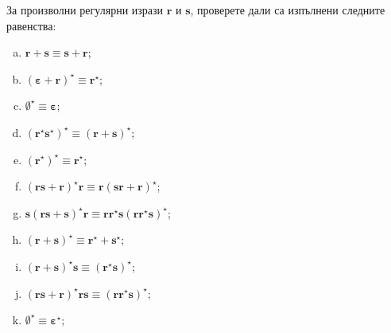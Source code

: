 \begin{problem}
  За произволни регулярни изрази $\bm{r}$ и $\bm{s}$, проверете дали са изпълнени следните равенства:
  \begin{enumerate}[a)]
  \item 
    $\bm{r + s} \equiv \bm{s + r}$;
  \item
    $\bm{(\varepsilon + r)^\star} \equiv \bm{r^\star}$;
  \item
    $\bm{\emptyset^\star} \equiv \bm{\varepsilon}$;
  \item
    $\bm{(r^\star s^\star)^\star} \equiv \bm{(r+s)^\star}$;
  \item
    $\bm{(r^\star)^\star} \equiv \bm{r^\star}$;
  \item
    $\bm{(rs + r)^\star r} \equiv \bm{r(sr+r)^\star}$;
  \item
    $\bm{s(rs+s)^\star r} \equiv \bm{rr^\star s(rr^\star s)^\star}$;
  \item
    $\bm{(r+s)^\star} \equiv \bm{r^\star + s^\star}$;
  \item
    $\bm{(r+s)^\star s} \equiv \bm{(r^\star s)^\star}$;
  \item
    $\bm{(rs + r)^\star rs} \equiv \bm{(rr^\star s)^\star}$;
  \item
    $\bm{\emptyset^\star} \equiv \bm{\varepsilon^\star}$;
  \end{enumerate}
\end{problem}



